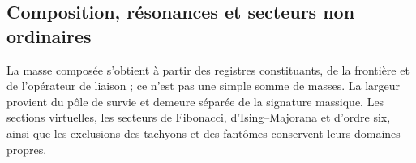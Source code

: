 \let\subsubsection\paragraph
\let\clearpage\relax

\endgroup
\begingroup
\let\chapter\section
\let\section\subsection
\let\subsection\subsubsection
\let\subsubsection\paragraph
\let\clearpage\relax

\endgroup

\section{Composition, résonances et secteurs non ordinaires}
La masse composée s’obtient à partir des registres constituants, de la frontière et de l’opérateur de liaison ; ce n’est pas une simple somme de masses. La largeur provient du pôle de survie et demeure séparée de la signature massique. Les sections virtuelles, les secteurs de Fibonacci, d’Ising--Majorana et d’ordre six, ainsi que les exclusions des tachyons et des fantômes conservent leurs domaines propres.

